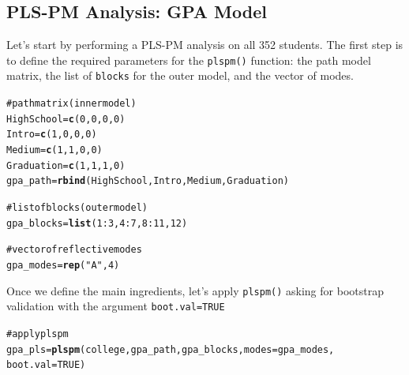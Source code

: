 \documentclass[12pt]{book}\usepackage{graphicx, color}
\makeatletter
\newcommand{\hlfunctioncall}[1]{\textcolor[rgb]{0.501960784313725,0,0.329411764705882}{\textbf{#1}}}%
\newcommand{\hlstring}[1]{\textcolor[rgb]{0.6,0.6,1}{#1}}%
\newcommand{\hlcomment}[1]{\textcolor[rgb]{0.180392156862745,0.6,0.341176470588235}{#1}}%
\newenvironment{kframe}{%
 \def\at@end@of@kframe{}%
 \ifinner\ifhmode%
  \def\at@end@of@kframe{\end{minipage}}%
  \begin{minipage}{\columnwidth}%
 \fi\fi%
 \def\FrameCommand##1{\hskip\@totalleftmargin \hskip-\fboxsep
 \colorbox{shadecolor}{##1}\hskip-\fboxsep
     \hskip-\linewidth \hskip-\@totalleftmargin \hskip\columnwidth}%
 \MakeFramed {\advance\hsize-\width
   \@totalleftmargin\z@ \linewidth\hsize
   \@setminipage}}%
 {\par\unskip\endMakeFramed%
 \at@end@of@kframe}
\newenvironment{knitrout}{}{} %
\newcommand{\fplspm}{\texttt{plspm()}}
\newcommand{\code}[1]{\texttt{#1}}
\makeatother
\begin{document}
\subsection{PLS-PM Analysis: GPA Model}
Let's start by performing a PLS-PM analysis on all 352 students. The first step is to define the required parameters for the \code{plspm()} function: the path model matrix, the list of \code{blocks} for the outer model, and the vector of modes.
\begin{knitrout}
\color{fgcolor}\begin{kframe}
\begin{alltt}
\hlcomment{# path matrix (inner model)}
HighSchool = \hlfunctioncall{c}(0, 0, 0, 0)
Intro = \hlfunctioncall{c}(1, 0, 0, 0)
Medium = \hlfunctioncall{c}(1, 1, 0, 0)
Graduation = \hlfunctioncall{c}(1, 1, 1, 0)
gpa_path = \hlfunctioncall{rbind}(HighSchool, Intro, Medium, Graduation)

\hlcomment{# list of blocks (outer model)}
gpa_blocks = \hlfunctioncall{list}(1:3, 4:7, 8:11, 12)

\hlcomment{# vector of reflective modes}
gpa_modes = \hlfunctioncall{rep}(\hlstring{"A"}, 4)
\end{alltt}
\end{kframe}
\end{knitrout}


Once we define the main ingredients, let's apply \fplspm{} asking for bootstrap validation with the argument \code{boot.val=TRUE}
\begin{knitrout}
\color{fgcolor}\begin{kframe}
\begin{alltt}
\hlcomment{# apply plspm}
gpa_pls = \hlfunctioncall{plspm}(college, gpa_path, gpa_blocks, modes = gpa_modes, 
                boot.val = TRUE)
\end{alltt}
\end{kframe}
\end{knitrout}
\end{document}
